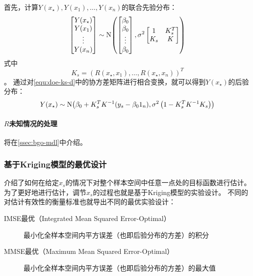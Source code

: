 \documentclass[index]{subfiles}
\begin{document}
首先，计算$Y(x_\star),Y(x_1),\ldots,Y(x_n)$的联合先验分布：
\begin{equation}\label{equ:doe-ks-d}
  \begin{bmatrix} Y(x_\star) \\ Y(x_1) \\ \vdots \\ Y(x_n) \end{bmatrix}
  \sim \operatorname{N}\!\left(
    \begin{bmatrix} \beta_0 \\ \beta_0 \\ \vdots \\ \beta_0 \end{bmatrix}
  ,\sigma^2
    \begin{bmatrix}
      1 & K_s^T \\
      K_s & K
    \end{bmatrix}
  \right)
\end{equation}
式中
\begin{equation}\label{equ:doe-ks}
  K_s = \left(R(x_\star, x_1), \ldots, R(x_\star, x_n)\right)^T
\end{equation}
。
通过对\cref{equ:doe-ks-d}中的协方差矩阵进行相合变换\cite{rasmussen2004}，就可以得到$Y(x_\star)$的后验分布：
\begin{equation}\label{equ:doe-y}
  Y(x_\star) \sim \operatorname{N}\!\left(\beta_0 + K_s^T K^{-1} (y_s - \beta_0 {1}_n),\sigma^2 \left(1 - K_s^T K^{-1} K_s\right)\right)
\end{equation}

\paragraph{$R$未知情况的处理} 将在\cref{ssec:bgo-mdl}中介绍。

\subsubsection{基于Kriging模型的最优设计}\label{sssec:doe-k-o}
介绍了如何在给定$x_s$的情况下对整个样本空间中任意一点处的目标函数进行估计。
为了更好地进行估计，调节$x_s$的过程也就是基于Kriging模型的实验设计\cite{pronzato2012}。
不同的对估计有效性的衡量标准也就导出不同的最优实验设计：
\begin{description}
  \item[IMSE最优（Integrated Mean Squared Error-Optimal）]\cite{sacks1989} 最小化全样本空间内平方误差（也即后验分布的方差）的积分
  \item[MMSE最优（Maximum Mean Squared Error-Optimal）]\cite{sacks1989} 最小化全样本空间内平方误差（也即后验分布的方差）的最大值
\end{description}
\end{document}
